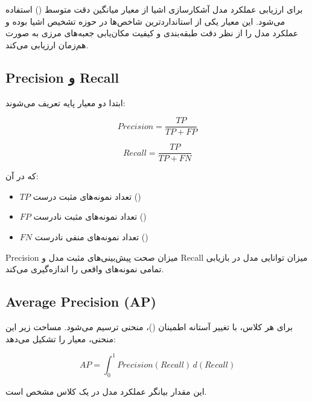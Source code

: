 \documentclass[a4paper, 10pt, twocolumn]{article}
\begin{document}
	برای ارزیابی عملکرد مدل آشکارسازی اشیا از معیار میانگین دقت متوسط () استفاده می‌شود. این معیار یکی از استانداردترین شاخص‌ها در حوزه تشخیص اشیا بوده و عملکرد مدل را از نظر دقت طبقه‌بندی و کیفیت مکان‌یابی جعبه‌های مرزی به صورت هم‌زمان ارزیابی می‌کند.
	
	\subsection{Precision و Recall}
	
	ابتدا دو معیار پایه تعریف می‌شوند:
	
	\begin{equation}
		Precision = \frac{TP}{TP + FP}
	\end{equation}
	
	\begin{equation}
		Recall = \frac{TP}{TP + FN}
	\end{equation}
	
	که در آن:
	\begin{itemize}
		\item $TP$ تعداد نمونه‌های مثبت درست ()
		\item $FP$ تعداد نمونه‌های مثبت نادرست ()
		\item $FN$ تعداد نمونه‌های منفی نادرست ()
	\end{itemize}
	
	Precision میزان صحت پیش‌بینی‌های مثبت مدل و Recall میزان توانایی مدل در بازیابی تمامی نمونه‌های واقعی را اندازه‌گیری می‌کند.
	
	\subsection{Average Precision (AP)}
	
	برای هر کلاس، با تغییر آستانه اطمینان ()، منحنی  ترسیم می‌شود. مساحت زیر این منحنی، معیار  را تشکیل می‌دهد:
	
	\begin{equation}
		AP = \int_0^1 Precision(Recall) \, d(Recall)
	\end{equation}
	
	این مقدار بیانگر عملکرد مدل در یک کلاس مشخص است.
	
	\subsection{}
	
\end{document}
